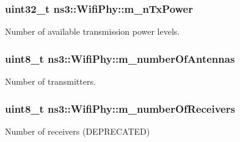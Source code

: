 \subsubsection[{\texorpdfstring{m\+\_\+n\+Tx\+Power}{m_nTxPower}}]{\setlength{\rightskip}{0pt plus 5cm}uint32\+\_\+t ns3\+::\+Wifi\+Phy\+::m\+\_\+n\+Tx\+Power\hspace{0.3cm}{\ttfamily [private]}}\hypertarget{classns3_1_1WifiPhy_a8b60afe8722e7057024166152a813487}{}\label{classns3_1_1WifiPhy_a8b60afe8722e7057024166152a813487}


Number of available transmission power levels. 

\subsubsection[{\texorpdfstring{m\+\_\+number\+Of\+Antennas}{m_numberOfAntennas}}]{\setlength{\rightskip}{0pt plus 5cm}uint8\+\_\+t ns3\+::\+Wifi\+Phy\+::m\+\_\+number\+Of\+Antennas\hspace{0.3cm}{\ttfamily [private]}}\hypertarget{classns3_1_1WifiPhy_a5bd02c25f62d98dad463610d29c9b9c1}{}\label{classns3_1_1WifiPhy_a5bd02c25f62d98dad463610d29c9b9c1}


Number of transmitters. 

\subsubsection[{\texorpdfstring{m\+\_\+number\+Of\+Receivers}{m_numberOfReceivers}}]{\setlength{\rightskip}{0pt plus 5cm}uint8\+\_\+t ns3\+::\+Wifi\+Phy\+::m\+\_\+number\+Of\+Receivers\hspace{0.3cm}{\ttfamily [private]}}\hypertarget{classns3_1_1WifiPhy_a2fca337488695e8f4e35813505184b4b}{}\label{classns3_1_1WifiPhy_a2fca337488695e8f4e35813505184b4b}


Number of receivers (D\+E\+P\+R\+E\+C\+A\+T\+ED) 

